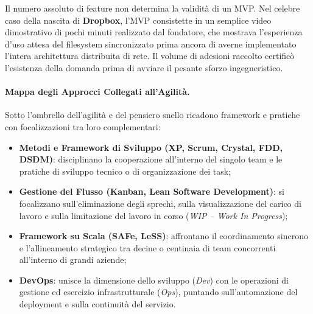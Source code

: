 \documentclass[12pt]{extarticle}
\begin{document}
\noindent Il numero assoluto di feature non determina la validità di un MVP. Nel celebre caso della nascita di \textbf{Dropbox}, l'MVP consistette in un semplice video dimostrativo di pochi minuti realizzato dal fondatore, che mostrava l'esperienza d'uso attesa del filesystem sincronizzato prima ancora di averne implementato l'intera architettura distribuita di rete. Il volume di adesioni raccolto certificò l'esistenza della domanda prima di avviare il pesante sforzo ingegneristico.

\paragraph{Mappa degli Approcci Collegati all'Agilità.}
Sotto l'ombrello dell'agilità e del pensiero snello ricadono framework e pratiche con focalizzazioni tra loro complementari:
\begin{itemize}
    \item \textbf{Metodi e Framework di Sviluppo (XP, Scrum, Crystal, FDD, DSDM)}: disciplinano la cooperazione all'interno del singolo team e le pratiche di sviluppo tecnico o di organizzazione dei task;
    \item \textbf{Gestione del Flusso (Kanban, Lean Software Development)}: si focalizzano sull'eliminazione degli sprechi, sulla visualizzazione del carico di lavoro e sulla limitazione del lavoro in corso (\textit{WIP -- Work In Progress});
    \item \textbf{Framework su Scala (SAFe, LeSS)}: affrontano il coordinamento sincrono e l'allineamento strategico tra decine o centinaia di team concorrenti all'interno di grandi aziende;
    \item \textbf{DevOps}: unisce la dimensione dello sviluppo (\textit{Dev}) con le operazioni di gestione ed esercizio infrastrutturale (\textit{Ops}), puntando sull'automazione del deployment e sulla continuità del servizio.
\end{itemize}
\end{document}
